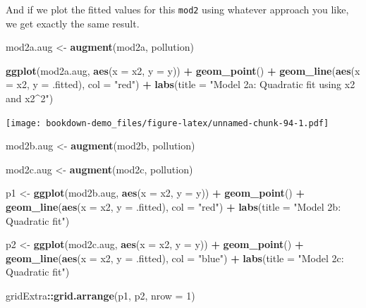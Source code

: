 \documentclass[]{book}
\newenvironment{Shaded}{\begin{snugshade}}{\end{snugshade}}
\newcommand{\KeywordTok}[1]{\textcolor[rgb]{0.13,0.29,0.53}{\textbf{#1}}}
\newcommand{\DataTypeTok}[1]{\textcolor[rgb]{0.13,0.29,0.53}{#1}}
\newcommand{\DecValTok}[1]{\textcolor[rgb]{0.00,0.00,0.81}{#1}}
\newcommand{\StringTok}[1]{\textcolor[rgb]{0.31,0.60,0.02}{#1}}
\newcommand{\OperatorTok}[1]{\textcolor[rgb]{0.81,0.36,0.00}{\textbf{#1}}}
\newcommand{\NormalTok}[1]{#1}
\theoremstyle{definition}
\theoremstyle{definition}
\theoremstyle{definition}
\theoremstyle{remark}
\begin{document}
And if we plot the fitted values for this \texttt{mod2} using whatever
approach you like, we get exactly the same result.

\begin{Shaded}
\begin{Highlighting}[]
\NormalTok{mod2a.aug <-}\StringTok{ }\KeywordTok{augment}\NormalTok{(mod2a, pollution)}

\KeywordTok{ggplot}\NormalTok{(mod2a.aug, }\KeywordTok{aes}\NormalTok{(}\DataTypeTok{x =}\NormalTok{ x2, }\DataTypeTok{y =}\NormalTok{ y)) }\OperatorTok{+}
\StringTok{    }\KeywordTok{geom_point}\NormalTok{() }\OperatorTok{+}
\StringTok{    }\KeywordTok{geom_line}\NormalTok{(}\KeywordTok{aes}\NormalTok{(}\DataTypeTok{x =}\NormalTok{ x2, }\DataTypeTok{y =}\NormalTok{ .fitted), }\DataTypeTok{col =} \StringTok{"red"}\NormalTok{) }\OperatorTok{+}
\StringTok{    }\KeywordTok{labs}\NormalTok{(}\DataTypeTok{title =} \StringTok{"Model 2a: Quadratic fit using x2 and x2^2"}\NormalTok{)}
\end{Highlighting}
\end{Shaded}

\texttt{[image: bookdown-demo\_files/figure-latex/unnamed-chunk-94-1.pdf]}

\begin{Shaded}
\begin{Highlighting}[]
\NormalTok{mod2b.aug <-}\StringTok{ }\KeywordTok{augment}\NormalTok{(mod2b, pollution)}

\NormalTok{mod2c.aug <-}\StringTok{ }\KeywordTok{augment}\NormalTok{(mod2c, pollution)}

\NormalTok{p1 <-}\StringTok{ }\KeywordTok{ggplot}\NormalTok{(mod2b.aug, }\KeywordTok{aes}\NormalTok{(}\DataTypeTok{x =}\NormalTok{ x2, }\DataTypeTok{y =}\NormalTok{ y)) }\OperatorTok{+}
\StringTok{    }\KeywordTok{geom_point}\NormalTok{() }\OperatorTok{+}
\StringTok{    }\KeywordTok{geom_line}\NormalTok{(}\KeywordTok{aes}\NormalTok{(}\DataTypeTok{x =}\NormalTok{ x2, }\DataTypeTok{y =}\NormalTok{ .fitted), }\DataTypeTok{col =} \StringTok{"red"}\NormalTok{) }\OperatorTok{+}
\StringTok{    }\KeywordTok{labs}\NormalTok{(}\DataTypeTok{title =} \StringTok{"Model 2b: Quadratic fit"}\NormalTok{)}

\NormalTok{p2 <-}\StringTok{ }\KeywordTok{ggplot}\NormalTok{(mod2c.aug, }\KeywordTok{aes}\NormalTok{(}\DataTypeTok{x =}\NormalTok{ x2, }\DataTypeTok{y =}\NormalTok{ y)) }\OperatorTok{+}
\StringTok{    }\KeywordTok{geom_point}\NormalTok{() }\OperatorTok{+}
\StringTok{    }\KeywordTok{geom_line}\NormalTok{(}\KeywordTok{aes}\NormalTok{(}\DataTypeTok{x =}\NormalTok{ x2, }\DataTypeTok{y =}\NormalTok{ .fitted), }\DataTypeTok{col =} \StringTok{"blue"}\NormalTok{) }\OperatorTok{+}
\StringTok{    }\KeywordTok{labs}\NormalTok{(}\DataTypeTok{title =} \StringTok{"Model 2c: Quadratic fit"}\NormalTok{)}

\NormalTok{gridExtra}\OperatorTok{::}\KeywordTok{grid.arrange}\NormalTok{(p1, p2, }\DataTypeTok{nrow =} \DecValTok{1}\NormalTok{)}
\end{Highlighting}
\end{Shaded}
\end{document}
